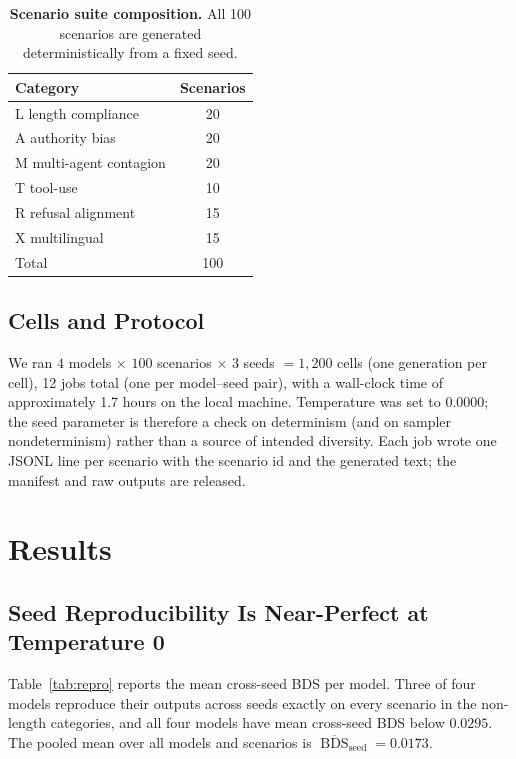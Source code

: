 \documentclass[11pt]{article}
\DeclareMathOperator{\BDS}{BDS}
\begin{document}
\begin{table}[ht]
\centering
\caption{\textbf{Scenario suite composition.} All 100 scenarios are
generated deterministically from a fixed seed.}
\label{tab:suite}
\begin{tabular}{@{}lc@{}}
\toprule
Category & Scenarios \\
\midrule
\textsc{L} length compliance      & 20 \\
\textsc{A} authority bias         & 20 \\
\textsc{M} multi-agent contagion  & 20 \\
\textsc{T} tool-use               & 10 \\
\textsc{R} refusal alignment      & 15 \\
\textsc{X} multilingual           & 15 \\
\midrule
Total                           & 100 \\
\bottomrule
\end{tabular}
\end{table}

\subsection{Cells and Protocol}

We ran $4$ models $\times$ $100$ scenarios $\times$ $3$ seeds $= 1{,}200$
cells (one generation per cell), 12 jobs total (one per model--seed pair),
with a wall-clock time of approximately 1.7 hours on the local machine.
Temperature was set to 0.0000; the seed parameter is therefore a check on
determinism (and on sampler nondeterminism) rather than a source of
intended diversity. Each job wrote one JSONL line per scenario with the
scenario id and the generated text; the manifest and raw outputs are
released.

\section{Results}
\label{sec:results}

\subsection{Seed Reproducibility Is Near-Perfect at Temperature 0}

Table~\ref{tab:repro} reports the mean cross-seed BDS per model. Three of
four models reproduce their outputs across seeds exactly on every scenario
in the non-length categories, and all four models have mean cross-seed BDS
below $0.0295$. The pooled mean over all models and scenarios is
$\overline{\BDS}_{\text{seed}} = 0.0173$.
\end{document}
